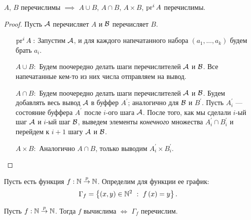 \begin{statement}
    $A$, $B$ перечислимы $\implies$ $A \cup B$, $A \cap B$, $A \times B$, $\pr^{i} A$ перечислимы.
\end{statement}
\begin{proof}
    Пусть $\AA$ перечисляет $A$ и $\BB$ перечисляет $B$.
    \begin{enumerate}
        \item[$\pr^{i} A:$] Запустим $\AA$, и для каждого напечатанного набора $\left(a_{1}, \ldots, a_{k}\right)$ будем брать $a_{i}$.
        \item[$A \cup B:$] Будем поочередно делать шаги перечислителей $\AA$ и $\BB$.
        Все напечатанные кем-то из них числа отправляем на вывод.
        \item[$A \cap B:$] Будем поочередно делать шаги перечислителей $\AA$ и $\BB$.
        Будем добавлять весь вывод $\AA$ в буффер $A^{\prime}$; аналогично для $\BB$ и $B^{\prime}$.
        Пусть $A_{i}^{\prime}$ --- состояние буффера $A^{\prime}$ после $i$-ого шага $\AA$.
        После того, как мы сделали $i$-ый шаг $\AA$ и $i$-ый шаг $\BB$, выведем элементы {\it конечного} множества $A^{\prime}_{i} \cap B^{\prime}_{i}$ и перейдем к $i + 1$ шагу $\AA$ и $\BB$.
        \item[$A \times B:$] Аналогично $A \cap B$, только выводим $A^{\prime}_{i} \times B^{\prime}_{i}$.
        \qedhere
    \end{enumerate}
\end{proof}

\begin{definition}
    Пусть есть функция $f: \N \pto \N$.
    Определим для функции ее график:
    $$
        \Gamma_{f} = \left\{\left(x, y\right) \in \N^{2}~:~f\left(x\right) = y\right\}.
    $$
\end{definition}

\begin{theorem}
    Пусть $f: \N \pto \N$.
    Тогда $f$ вычислима $\iff$ $\Gamma_{f}$ перечислим.
\end{theorem}

